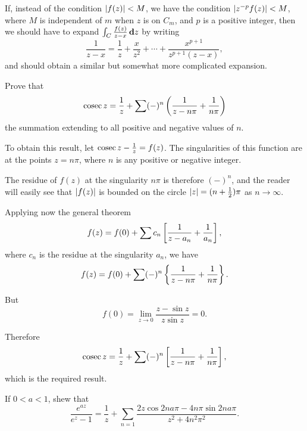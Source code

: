 If, instead of the condition $\left| f(z) \right| < M$, we have the
condition $\left|  z^{-p} f(z)  \right| < M$,
where $M$ is independent of $m$ when $z$ is on $C_{m}$, and $p$ is
a positive integer, then we should have to
expand $\int_{C} \frac{f(z)}{z-x} \, \mathbf{d} z$ by writing
$$
\frac{1}{z-x}
=
\frac{1}{z}
+ \frac{x}{z^{2}}
+ \cdots
+ \frac{x^{p+1}}{z^{p+1}(z-x)},
$$
and should obtain a similar but somewhat more complicated expansion.
\begin{wandwexample}
Prove that
$$
\operatorname{cosec} z
=
\frac{1}{z}
+
\sum (-)^{n}
\left( \frac{1}{z-n\pi} + \frac{1}{n\pi} \right)
$$
the summation extending to all positive and negative values of $n$.

To obtain this result, let $\operatorname{cosec} z - \frac{1}{z} = f(z)$.
The singularities of this function are at the
points $z=n\pi$, where $n$ is any positive or negative integer.

The residue of $f(z)$ at the singularity $n\pi$ is therefore
$(-)^{n}$, and the reader will easily see that $\left| f(z) \right|$ is
bounded on the circle $\left| z \right| = (n + \frac{1}{2}) \pi$ as
$n \rightarrow \infty$.

Applying now the general theorem
$$
f(z)
=
f(0)
+
\sum c_{n} \left[  \frac{1}{z-a_{n}} + \frac{1}{a_{n}}   \right],
$$
where $c_{n}$ is the residue at the singularity $a_{n}$, we have
$$
f(z)
=
f(0)
+
\sum (-)^{n} \left\{  \frac{1}{z-n\pi} + \frac{1}{n\pi}   \right\}.
$$

But
$$
f(0)
=
\lim_{z \rightarrow 0} \frac{z - \sin z}{z \sin z} = 0.
$$

Therefore 
$$
\operatorname{cosec} z
=
\frac{1}{z}
+
\sum (-)^{n} \left[  \frac{1}{z-n\pi} + \frac{1}{n\pi}   \right],
$$
which is the required result.
\end{wandwexample}
\begin{wandwexample}
If $0<a<1$, shew that
$$
\frac{e^{az}}{e^{z}-1}
=
\frac{1}{z}
+
\sum_{n=1}
\frac{2z \cos 2na\pi - 4n\pi \sin 2na\pi}{z^{2}+4n^{2}\pi^{2}}.
$$
\end{wandwexample}
